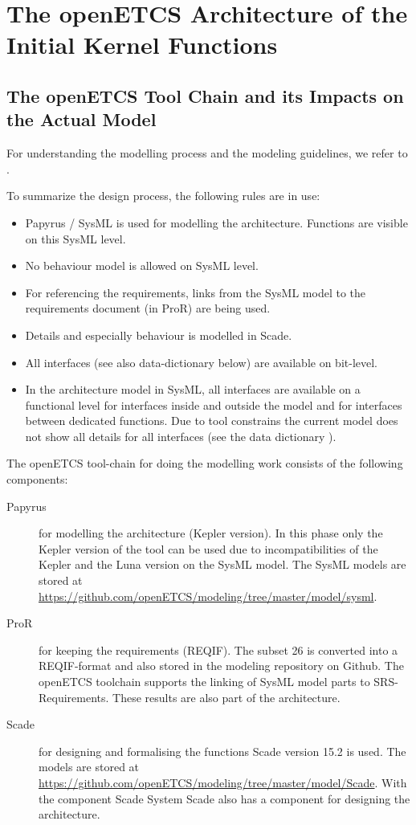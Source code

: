 \documentclass{template/openetcs_report}
\begin{document}
\chapter{The openETCS Architecture of the Initial Kernel Functions}\label{sec:the-openetcs-architecture-of-the-initial-kernel-functions}

\section{The openETCS Tool Chain and its Impacts on the Actual Model}

For understanding the modelling process and the modeling guidelines, we refer to \cite{wp3-dow}. 

To summarize the design process, the following rules are in use:
\begin{itemize}
\item Papyrus / SysML is used for modelling the architecture. Functions are visible on this SysML level.
\item No behaviour model is allowed on SysML level.
\item For referencing the requirements, links from the SysML model to the requirements document (in ProR) are being used.
\item Details and especially behaviour is modelled in Scade.
\item All interfaces (see also data-dictionary below) are available on bit-level.
\item In the architecture model in SysML, all interfaces are available on a functional level for interfaces inside and outside the model and for interfaces between dedicated functions. Due to tool constrains the current model does not show all details for all interfaces (see the data dictionary \cite{dataDictionary}).
\end{itemize}

The openETCS tool-chain for doing the modelling work consists of the following components:
\begin{description}
	\item[Papyrus] for modelling the architecture (Kepler version).
	In this phase only the Kepler version of the tool can be used due to incompatibilities of the Kepler and the Luna version on the SysML model. The SysML models are stored at \url{https://github.com/openETCS/modeling/tree/master/model/sysml}.
	\item[ProR] for keeping the requirements (REQIF).
	The subset 26 is converted into a REQIF-format and also stored in the modeling repository on Github. The openETCS toolchain supports the linking of SysML model parts to SRS-Requirements. These results are also part of the architecture.
	\item[Scade] for designing and formalising the functions Scade version 15.2 is used.
	The models are stored at \url{https://github.com/openETCS/modeling/tree/master/model/Scade}.
	With the component Scade System Scade also has a component for designing the architecture.
\end{description}
\end{document}
